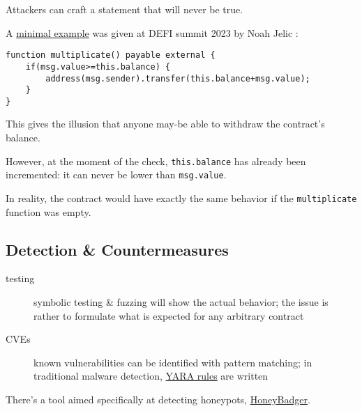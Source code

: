Attackers can craft a statement that will never be true.

A \href{https://www.youtube.com/watch?v=4bSQWoy5a_k}{minimal example} was given at DEFI summit 2023 by Noah Jelic \cite{video-hacker-traps}:

\begin{lstlisting}[language=Solidity]
function multiplicate() payable external {
    if(msg.value>=this.balance) {
        address(msg.sender).transfer(this.balance+msg.value);
    }
}
\end{lstlisting}

This gives the illusion that anyone may-be able to withdraw the contract's balance.

However, at the moment of the check, \lstinline[language=Solidity]{this.balance} has already been incremented: it can never be lower than \lstinline[language=Solidity]{msg.value}.

In reality, the contract would have exactly the same behavior if the \lstinline{multiplicate} function was empty.

\subsection{Detection \& Countermeasures}

\begin{description}
\item[testing]{symbolic testing \& fuzzing will show the actual behavior; the issue is rather to formulate what is expected for any arbitrary contract}
\item[CVEs]{known vulnerabilities can be identified with pattern matching; in traditional malware detection, \href{https://yara.readthedocs.io/en/stable/writingrules.html}{YARA rules} are written}
\end{description}

There's a tool aimed specifically at detecting honeypots, \href{https://github.com/christoftorres/HoneyBadger}{HoneyBadger}.
